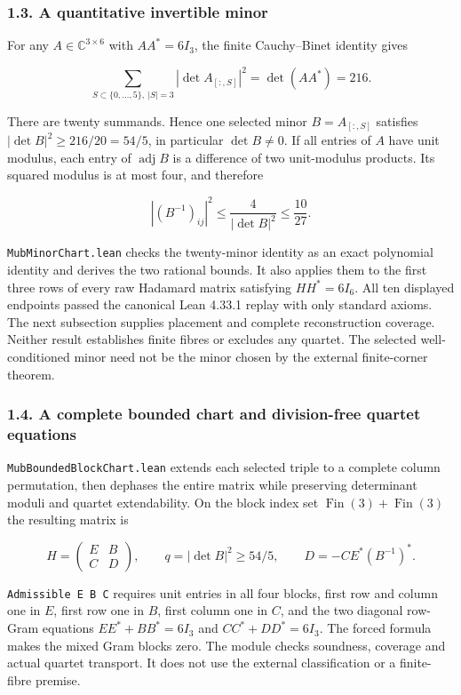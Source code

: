 \documentclass[
]{article}
\begin{document}
\subsubsection{1.3. A quantitative invertible
minor}\label{a-quantitative-invertible-minor}

For any \(A\in\mathbb C^{3\times6}\) with \(AA^*=6I_3\), the finite
Cauchy--Binet identity gives

\[
\sum_{S\subset\{0,\ldots,5\},\ |S|=3}|\det A_{[:,S]}|^2
=\det(AA^*)=216.
\]

There are twenty summands. Hence one selected minor \(B=A_{[:,S]}\)
satisfies \(|\det B|^2\ge216/20=54/5\), in particular \(\det B\ne0\). If
all entries of \(A\) have unit modulus, each entry of
\(\operatorname{adj}B\) is a difference of two unit-modulus products.
Its squared modulus is at most four, and therefore

\[
|(B^{-1})_{ij}|^2\le\frac4{|\det B|^2}\le\frac{10}{27}.
\]

\nolinkurl{MubMinorChart.lean} checks the twenty-minor identity as an
exact polynomial identity and derives the two rational bounds. It also
applies them to the first three rows of every raw Hadamard matrix
satisfying \(HH^*=6I_6\). All ten displayed endpoints passed the
canonical Lean 4.33.1 replay with only standard axioms. The next
subsection supplies placement and complete reconstruction coverage.
Neither result establishes finite fibres or excludes any quartet. The
selected well-conditioned minor need not be the minor chosen by the
external finite-corner theorem.

\subsubsection{1.4. A complete bounded chart and division-free quartet
equations}\label{a-complete-bounded-chart-and-division-free-quartet-equations}

\nolinkurl{MubBoundedBlockChart.lean} extends each selected triple to a
complete column permutation, then dephases the entire matrix while
preserving determinant moduli and quartet extendability. On the block
index set \(\operatorname{Fin}(3)+\operatorname{Fin}(3)\) the resulting
matrix is

\[
H=\begin{pmatrix}E&B\\C&D\end{pmatrix},\qquad
q=|\det B|^2\ge54/5,\qquad D=-CE^*(B^{-1})^*.
\]

\nolinkurl{Admissible E B C} requires unit entries in all four blocks,
first row and column one in \(E\), first row one in \(B\), first column
one in \(C\), and the two diagonal row-Gram equations \(EE^*+BB^*=6I_3\)
and \(CC^*+DD^*=6I_3\). The forced formula makes the mixed Gram blocks
zero. The module checks soundness, coverage and actual quartet
transport. It does not use the external classification or a finite-fibre
premise.
\end{document}
